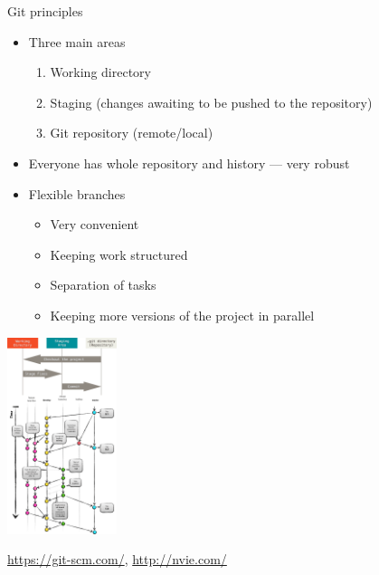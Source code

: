 \documentclass[compress, ucs, xelatex, 11pt, xcolor=svgnames,
  hyperref={
    bookmarks=true,
    unicode=true,
    colorlinks=true,
    pdftitle={Linux, command line and MetaCentrum},
    plainpages=false,
    pdfauthor={Vojtech Zeisek},
    pdfsubject={Course about use of Linux command line, writing shell scripts and using MetaCentrum of CESNET},
    pdfcreator={XeLaTeX},
    pdfkeywords={Linux, GNU, BASH, shell, command line, MetaCentrum},
    linkcolor=DarkRed,
    anchorcolor=DarkBlue,
    citecolor=Indigo,
    filecolor=NavyBlue,
    menucolor=DarkMagenta,
    urlcolor=DarkBlue,
    pdftex},
  url={hyphens, lowtilde} %
  ]{beamer}
\begin{document}
\begin{frame}[fragile]{Git principles}
  \begin{multicols}{2}
    \begin{itemize}
      \item Three main areas
      \begin{enumerate}
	\item Working directory
	\item Staging (changes awaiting to be pushed to the repository)
	\item Git repository (remote/local)
      \end{enumerate}
      \item Everyone has whole repository and history --- very robust
      \item Flexible branches
      \begin{itemize}
	\item Very convenient
	\item Keeping work structured
	\item Separation of tasks
	\item Keeping more versions of the project in parallel
      \end{itemize}
    \end{itemize}
    \begin{center}
      \includegraphics[height=5.75cm]{git.png}
    \end{center}
    \begin{flushright}
      \begin{footnotesize}
	\href{https://git-scm.com/book/en/v2/Getting-Started-Git-Basics}{https://git-scm.com/}, \href{http://nvie.com/posts/a-successful-git-branching-model/}{http://nvie.com/}
      \end{footnotesize}
    \end{flushright}
  \end{multicols}
\end{frame}
\end{document}
